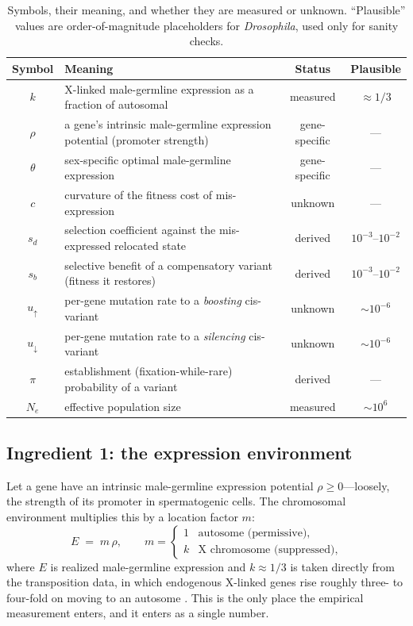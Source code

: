 \documentclass[11pt,a4paper]{article}
\newcommand{\Ne}{N_{e}}
\begin{document}
\begin{table}[h!]
\centering
\small
\caption{Symbols, their meaning, and whether they are measured or unknown. ``Plausible'' values are order-of-magnitude placeholders for \emph{Drosophila}, used only for sanity checks.}
\label{tab:notation}
\begin{tabular}{c p{7.4cm} c c}
\toprule
\textbf{Symbol} & \textbf{Meaning} & \textbf{Status} & \textbf{Plausible} \\
\midrule
$k$ & X-linked male-germline expression as a fraction of autosomal & measured & $\approx 1/3$ \\
$\rho$ & a gene's intrinsic male-germline expression potential (promoter strength) & gene-specific & --- \\
$\theta$ & sex-specific optimal male-germline expression & gene-specific & --- \\
$c$ & curvature of the fitness cost of mis-expression & unknown & --- \\
$s_d$ & selection coefficient against the mis-expressed relocated state & derived & $10^{-3}$--$10^{-2}$ \\
$s_b$ & selective benefit of a compensatory variant (fitness it restores) & derived & $10^{-3}$--$10^{-2}$ \\
$u_{\uparrow}$ & per-gene mutation rate to a \emph{boosting} cis-variant & unknown & $\sim 10^{-6}$ \\
$u_{\downarrow}$ & per-gene mutation rate to a \emph{silencing} cis-variant & unknown & $\sim 10^{-6}$ \\
$\pi$ & establishment (fixation-while-rare) probability of a variant & derived & --- \\
$\Ne$ & effective population size & measured & $\sim 10^{6}$ \\
\bottomrule
\end{tabular}
\end{table}

\subsection{Ingredient 1: the expression environment}

Let a gene have an intrinsic male-germline expression potential $\rho \ge 0$---loosely, the strength of its promoter in spermatogenic cells. The chromosomal environment multiplies this by a location factor $m$:
\begin{equation}
E \;=\; m\,\rho, \qquad m = \begin{cases} 1 & \text{autosome (permissive)},\\ k & \text{X chromosome (suppressed)},\end{cases}
\label{eq:env}
\end{equation}
where $E$ is realized male-germline expression and $k\approx 1/3$ is taken directly from the transposition data, in which endogenous X-linked genes rise roughly three- to four-fold on moving to an autosome \citep{landeen2016}. This is the only place the empirical measurement enters, and it enters as a single number.
\end{document}
